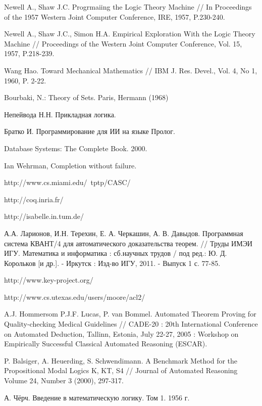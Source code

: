 \begin{thebibliography}{99}
 Newell A., Shaw J.C. Progrmaiing the Logic Theory Machine // In Proceedings of the 1957 Western Joint Computer Conference, IRE, 1957, P.230-240.

 Newell A., Shaw J.C., Simon H.A. Empirical Exploration With the Logic Theory Machine // Proceedings of the Western Joint Computer Conference, Vol. 15, 1957, P.218-239.

 Wang Hao. Toward Mechanical Mathematics // IBM J. Res. Devel., Vol. 4, No 1, 1960, P. 2-22. 

 Bourbaki, N.: Theory of Sets. Paris, Hermann (1968)

 Непейвода Н.Н. Прикладная логика.

 Братко И. Программирование для ИИ на языке Пролог.

 Database Systems: The Complete Book. 2000.

 Ian Wehrman, Completion without failure.

 http://www.cs.miami.edu/~tptp/CASC/

 http://coq.inria.fr/

 http://isabelle.in.tum.de/

 А.А. Ларионов, И.Н. Терехин, Е. А. Черкашин, А. В. Давыдов.
Программная система КВАНТ/4 для автоматического доказательства теорем.
// Труды ИМЭИ ИГУ. Математика и информатика : сб.научных трудов / под
ред.: Ю. Д. Корольков [и др.]. - Иркутск : Изд-во ИГУ, 2011. - Выпуск
1 с. 77-85.

 http://www.key-project.org/

 http://www.cs.utexas.edu/users/moore/acl2/



 A.J. Hommersom P.J.F. Lucas, P. van Bommel. Automated Theorem Proving for Quality-checking Medical Guidelines // CADE-20 : 20th International Conference on Automated Deduction, Tallinn, Estonia, July 22-27, 2005 : Workshop on Empirically Successful Classical Automated Reasoning (ESCAR).

 P. Balsiger, A. Heuerding, S. Schwendimann. A Benchmark Method for the Propositional Modal Logics K, KT, S4 // Journal of Automated Reasoning Volume 24, Number 3 (2000), 297-317.

 А. Чёрч. Введение в математическую логику. Том 1. 1956 г. 


\end{thebibliography}



